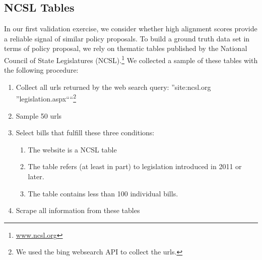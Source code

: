 \documentclass[12pt]{article} %
\begin{document}
\subsection{NCSL Tables}

In our first validation exercise, we consider whether high alignment scores provide a reliable signal of similar policy proposals. To build a ground truth data set in terms of policy proposal, we rely on thematic tables published by the National Council of State Legislatures (NCSL).\footnote{\url{www.ncsl.org}}  We collected a sample of these tables with the following procedure:

\begin{singlespacing}

\begin{enumerate}
    \item Collect all urls returned by the web search query: ''site:ncsl.org ''legislation.aspx````\footnote{We used the bing websearch API to collect the urls.}
    \item Sample 50 urls
    \item Select bills that fulfill these three conditions:
        \begin{enumerate}
            \item The website is a NCSL table
            \item The table refers (at least in part) to legislation introduced in 2011 or later.             \item The table contains less than 100 individual bills. 
        \end{enumerate}
    \item Scrape all information from these tables
\end{enumerate}

\end{singlespacing}
\end{document}

